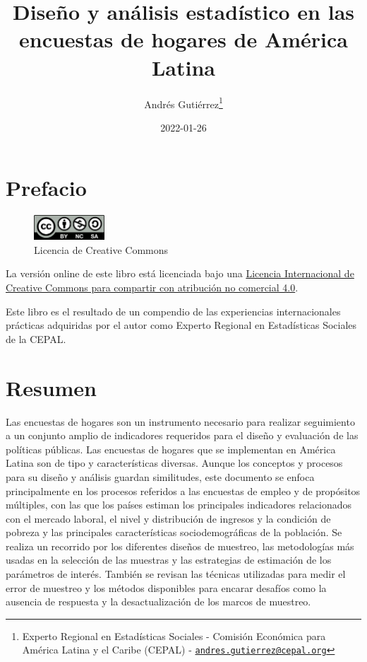 \documentclass[
  12pt,
  spanish,
]{book}
\title{Diseño y análisis estadístico en las encuestas de hogares de América Latina}
\author{Andrés Gutiérrez\footnote{Experto Regional en Estadísticas Sociales - Comisión Económica para América Latina y el Caribe (CEPAL) - \href{mailto:andres.gutierrez@cepal.org}{\nolinkurl{andres.gutierrez@cepal.org}}}}
\date{2022-01-26}
\begin{document}
\maketitle

{
\hypersetup{linkcolor=}
\setcounter{tocdepth}{1}
\tableofcontents
}
\listoffigures
\listoftables
\hypertarget{prefacio}{%
\chapter*{Prefacio}\label{prefacio}}

\begin{figure}
\includegraphics[width=100px]{Pics/CClicence} \caption{Licencia de Creative Commons}\label{fig:unnamed-chunk-1}
\end{figure}

La versión online de este libro está licenciada bajo una \href{http://creativecommons.org/licenses/by-nc-sa/4.0/}{Licencia Internacional de Creative Commons para compartir con atribución no comercial 4.0}.

Este libro es el resultado de un compendio de las experiencias internacionales prácticas adquiridas por el autor como Experto Regional en Estadísticas Sociales de la CEPAL.

\hypertarget{resumen}{%
\chapter{Resumen}\label{resumen}}

Las encuestas de hogares son un instrumento necesario para realizar seguimiento a un conjunto amplio de indicadores requeridos para el diseño y evaluación de las políticas públicas. Las encuestas de hogares que se implementan en América Latina son de tipo y características diversas. Aunque los conceptos y procesos para su diseño y análisis guardan similitudes, este documento se enfoca principalmente en los procesos referidos a las encuestas de empleo y de propósitos múltiples, con las que los países estiman los principales indicadores relacionados con el mercado laboral, el nivel y distribución de ingresos y la condición de pobreza y las principales características sociodemográficas de la población. Se realiza un recorrido por los diferentes diseños de muestreo, las metodologías más usadas en la selección de las muestras y las estrategias de estimación de los parámetros de interés. También se revisan las técnicas utilizadas para medir el error de muestreo y los métodos disponibles para encarar desafíos como la ausencia de respuesta y la desactualización de los marcos de muestreo.
\end{document}
